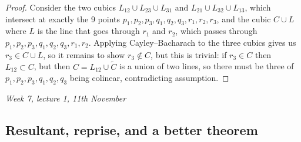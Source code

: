 \documentclass{article}
\theoremstyle{definition}
\begin{document}
\begin{proof}
Consider the two cubics $L_{12}\cup L_{23}\cup L_{31}$ and $L_{21}\cup L_{32}\cup L_{13}$, which intersect at exactly the 9 points $p_1,p_2,p_3,q_1,q_2,q_3,r_1,r_2,r_3$, and the cubic $C\cup L$ where $L$ is the line that goes through $r_1$ and $r_2$, which passes through $p_1,p_2,p_3,q_1,q_2,q_3,r_1,r_2$. Applying Cayley--Bacharach to the three cubics gives us $r_3\in C\cup L$, so it remains to show $r_3\notin C$, but this is trivial: if $r_3\in C$ then $L_{12}\subset C$, but then $C=L_{12}\cup\widetilde C$ is a union of two lines, so there must be three of $p_1,p_2,p_3,q_1,q_2,q_3$ being colinear, contradicting assumption.
\end{proof}

\begin{flushright}
\textit{Week 7, lecture 1, 11th November}
\end{flushright}

\subsection{Resultant, reprise, and a better theorem}
\end{document}

